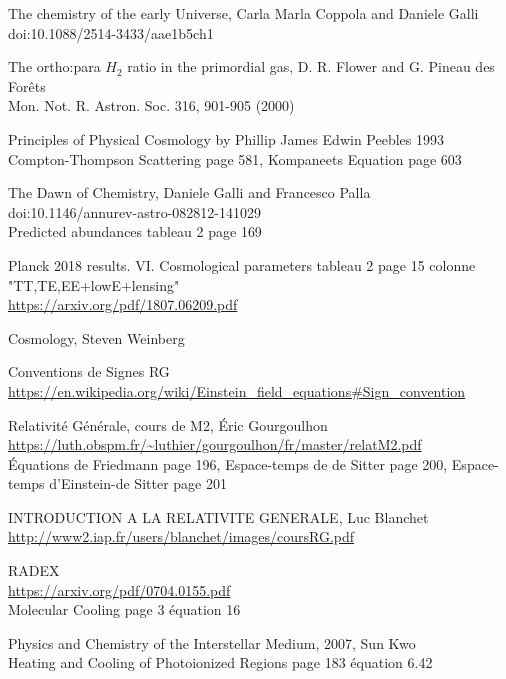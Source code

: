 \documentclass[10pt, a4paper]{report}
\numberwithin{equation}{subsection}
\begin{document}
\begin{thebibliography}{}

The chemistry of the early Universe, Carla Marla Coppola and Daniele Galli
\\doi:10.1088/2514-3433/aae1b5ch1

The ortho:para $H_2$ ratio in the primordial gas, D. R. Flower and G. Pineau des Forêts
\\Mon. Not. R. Astron. Soc. 316, 901-905 (2000)

Principles of Physical Cosmology by Phillip James Edwin Peebles 1993
\\Compton-Thompson Scattering page 581, Kompaneets Equation page 603

The Dawn of Chemistry, Daniele Galli and Francesco Palla
\\doi:10.1146/annurev-astro-082812-141029
\\Predicted abundances tableau 2 page 169

Planck 2018 results. VI. Cosmological parameters tableau 2 page 15 colonne "TT,TE,EE+lowE+lensing"
\\\url{https://arxiv.org/pdf/1807.06209.pdf}

Cosmology, Steven Weinberg

Conventions de Signes RG
\\\url{https://en.wikipedia.org/wiki/Einstein_field_equations#Sign_convention}

Relativité Générale, cours de M2, Éric Gourgoulhon
\\\url{https://luth.obspm.fr/~luthier/gourgoulhon/fr/master/relatM2.pdf}
\\Équations de Friedmann page 196, Espace-temps de de Sitter page 200, Espace-temps d’Einstein-de Sitter page 201

INTRODUCTION A LA RELATIVITE GENERALE, Luc Blanchet
\\\url{http://www2.iap.fr/users/blanchet/images/coursRG.pdf}

RADEX
\\\url{https://arxiv.org/pdf/0704.0155.pdf}
\\Molecular Cooling page 3 équation 16

Physics and Chemistry of the Interstellar Medium, 2007, Sun Kwo
\\Heating and Cooling of Photoionized Regions page 183 équation 6.42


\end{thebibliography}
\end{document}
